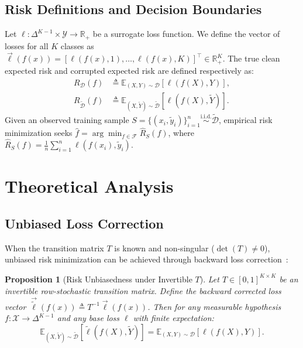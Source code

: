 \documentclass[10pt,twocolumn]{article}
\newtheorem{proposition}{Proposition}
\theoremstyle{definition}
\begin{document}
\subsection{Risk Definitions and Decision Boundaries}
Let $\ell: \Delta^{K-1} \times \mathcal{Y} \to \mathbb{R}_+$ be a surrogate loss function. We define the vector of losses for all $K$ classes as $\vec{\ell}(f(x)) = [\ell(f(x), 1), \dots, \ell(f(x), K)]^\top \in \mathbb{R}_+^K$. The true clean expected risk and corrupted expected risk are defined respectively as:
\begin{align}
R_{\mathcal{D}}(f) &\triangleq \mathbb{E}_{(X, Y) \sim \mathcal{D}} [\ell(f(X), Y)], \\
R_{\tilde{\mathcal{D}}}(f) &\triangleq \mathbb{E}_{(X, \tilde{Y}) \sim \tilde{\mathcal{D}}} [\ell(f(X), \tilde{Y})].
\end{align}
Given an observed training sample $S = \{(x_i, \tilde{y}_i)\}_{i=1}^n \overset{\text{i.i.d.}}{\sim} \tilde{\mathcal{D}}$, empirical risk minimization seeks $\hat{f} = \arg\min_{f \in \mathcal{F}} \hat{R}_S(f)$, where $\hat{R}_S(f) = \frac{1}{n} \sum_{i=1}^n \ell(f(x_i), \tilde{y}_i)$.

\section{Theoretical Analysis}

\subsection{Unbiased Loss Correction}
When the transition matrix $T$ is known and non-singular ($\det(T) \ne 0$), unbiased risk minimization can be achieved through backward loss correction~\cite{natarajan2013learning,patrini2017making}:

\begin{proposition}[Risk Unbiasedness under Invertible $T$]
\label{prop:unbiasedness}
Let $T \in [0, 1]^{K \times K}$ be an invertible row-stochastic transition matrix. Define the backward corrected loss vector $\vec{\tilde{\ell}}(f(x)) \triangleq T^{-1} \vec{\ell}(f(x))$. Then for any measurable hypothesis $f: \mathcal{X} \to \Delta^{K-1}$ and any base loss $\ell$ with finite expectation:
\begin{equation}
\mathbb{E}_{(X, \tilde{Y}) \sim \tilde{\mathcal{D}}} [\tilde{\ell}(f(X), \tilde{Y})] = \mathbb{E}_{(X, Y) \sim \mathcal{D}} [\ell(f(X), Y)].
\end{equation}
\end{proposition}
\end{document}
